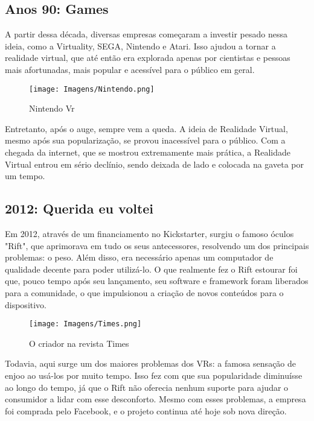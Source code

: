 \documentclass[article,a4paper,12pt,brazil,sumario=tradicional]{abntex2}
\begin{document}
        \subsection{Anos 90: Games}
            A partir dessa década, diversas empresas começaram a investir pesado nessa ideia, como a Virtuality, SEGA, Nintendo e Atari. Isso ajudou a tornar a realidade virtual, que até então era explorada apenas por cientistas e pessoas mais afortunadas, mais popular e acessível para o público em geral. 
            \begin{figure}[H]
                \centering
                \texttt{[image: Imagens/Nintendo.png]}
                \caption{Nintendo Vr}
                \label{fig:enter-label}
            \end{figure}
            Entretanto, após o auge, sempre vem a queda. A ideia de Realidade Virtual, mesmo após sua popularização, se provou inacessível para o público. Com a chegada da internet, que se mostrou extremamente mais prática, a Realidade Virtual entrou em sério declínio, sendo deixada de lado e colocada na gaveta por um tempo.
        \subsection{2012: Querida eu voltei}
            Em 2012, através de um financiamento no Kickstarter, surgiu o famoso óculos "Rift", que aprimorava em tudo os seus antecessores, resolvendo um dos principais problemas: o peso. Além disso, era necessário apenas um computador de qualidade decente para poder utilizá-lo. O que realmente fez o Rift estourar foi que, pouco tempo após seu lançamento, seu software e framework foram liberados para a comunidade, o que impulsionou a criação de novos conteúdos para o dispositivo.
            \begin{figure}[H]
                \centering
                \texttt{[image: Imagens/Times.png]}
                \caption{O criador na revista Times}
                \label{fig:enter-label}
            \end{figure}
            Todavia, aqui surge um dos maiores problemas dos VRs: a famosa sensação de enjoo ao usá-los por muito tempo. Isso fez com que sua popularidade diminuísse ao longo do tempo, já que o Rift não oferecia nenhum suporte para ajudar o consumidor a lidar com esse desconforto. Mesmo com esses problemas, a empresa foi comprada pelo Facebook, e o projeto continua até hoje sob nova direção.
\end{document}
